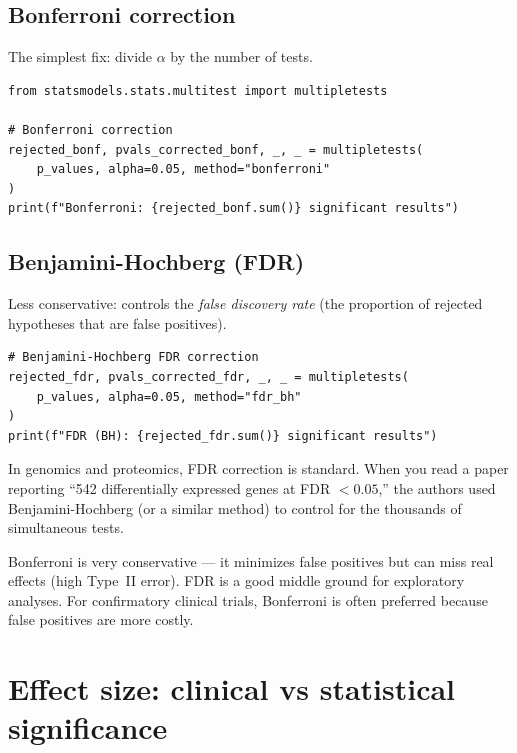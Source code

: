 \subsection{Bonferroni correction}

The simplest fix: divide $\alpha$ by the number of tests.

\begin{verbatim}
from statsmodels.stats.multitest import multipletests

# Bonferroni correction
rejected_bonf, pvals_corrected_bonf, _, _ = multipletests(
    p_values, alpha=0.05, method="bonferroni"
)
print(f"Bonferroni: {rejected_bonf.sum()} significant results")
\end{verbatim}

\subsection{Benjamini-Hochberg (FDR)}

Less conservative: controls the \emph{false discovery rate} (the proportion of rejected hypotheses that are false positives).

\begin{verbatim}
# Benjamini-Hochberg FDR correction
rejected_fdr, pvals_corrected_fdr, _, _ = multipletests(
    p_values, alpha=0.05, method="fdr_bh"
)
print(f"FDR (BH): {rejected_fdr.sum()} significant results")
\end{verbatim}

\begin{clinicalnote}
In genomics and proteomics, FDR correction is standard. When you read a paper reporting ``542 differentially expressed genes at FDR $< 0.05$,'' the authors used Benjamini-Hochberg (or a similar method) to control for the thousands of simultaneous tests.
\end{clinicalnote}

\begin{warningbox}
Bonferroni is very conservative --- it minimizes false positives but can miss real effects (high Type~II error). FDR is a good middle ground for exploratory analyses. For confirmatory clinical trials, Bonferroni is often preferred because false positives are more costly.
\end{warningbox}

\section{Effect size: clinical vs statistical significance}

